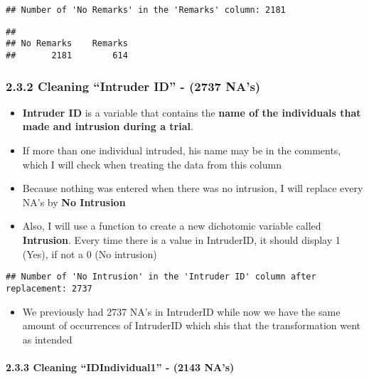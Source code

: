 \documentclass[
]{article}
\providecommand{\tightlist}{%
  \setlength{\itemsep}{0pt}\setlength{\parskip}{0pt}}
\begin{document}
\begin{verbatim}
## Number of 'No Remarks' in the 'Remarks' column: 2181
\end{verbatim}

\begin{verbatim}
## 
## No Remarks    Remarks 
##       2181        614
\end{verbatim}

\hypertarget{cleaning-intruder-id---2737-nas}{%
\subsubsection{2.3.2 Cleaning ``Intruder ID'' - (2737
NA's)}\label{cleaning-intruder-id---2737-nas}}

\begin{itemize}
\tightlist
\item
  \textbf{Intruder ID} is a variable that contains the \textbf{name of
  the individuals that made and intrusion during a trial}.
\item
  If more than one individual intruded, his name may be in the comments,
  which I will check when treating the data from this column
\item
  Because nothing was entered when there was no intrusion, I will
  replace every NA's by \textbf{No Intrusion}
\item
  Also, I will use a function to create a new dichotomic variable called
  \textbf{Intrusion}. Every time there is a value in IntruderID, it
  should display 1 (Yes), if not a 0 (No intrusion)
\end{itemize}

\begin{verbatim}
## Number of 'No Intrusion' in the 'Intruder ID' column after replacement: 2737
\end{verbatim}

\begin{itemize}
\tightlist
\item
  We previously had 2737 NA's in IntruderID while now we have the same
  amount of occurrences of IntruderID which shis that the transformation
  went as intended
\end{itemize}

\hypertarget{cleaning-idindividual1---2143-nas}{%
\paragraph{2.3.3 Cleaning ``IDIndividual1'' - (2143
NA's)}\label{cleaning-idindividual1---2143-nas}}
\end{document}
